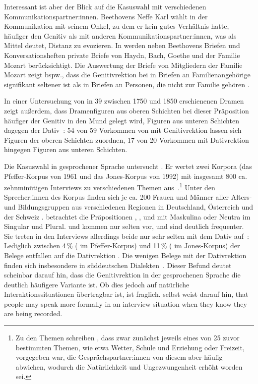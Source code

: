 Interessant ist aber der Blick auf die Kasuswahl mit verschiedenen Kommunikationspartner:innen. 
Beethovens Neffe Karl wählt in der Kommunikation mit seinem Onkel, zu dem er kein gutes Verhältnis hatte, häufiger den Genitiv als mit anderen Kommunikationspartner:innen, was \citet[s.][29]{Sato.2015} als Mittel deutet, Distanz zu evozieren. 
In \citet{Sato.2022} werden neben Beethovens Briefen und Konversationsheften private Briefe von Haydn, Bach, Goethe und der Familie Mozart berücksichtigt.
Die Auswertung der Briefe von Mitgliedern der Familie Mozart zeigt bspw., dass die Genitivrektion bei \wegen{} in Briefen an Familienangehörige signifikant seltener ist als in Briefen an Personen, die nicht zur Familie gehören \citep[s.][96--97]{Sato.2022}. 

In einer Untersuchung von \wegen{} in 39 zwischen 1750 und 1850 erschienenen Dramen zeigt \citet[]{Sato.2016} außerdem, dass Dramenfiguren aus oberen Schichten bei dieser Präposition h{\"a}ufiger der Genitiv in den Mund gelegt wird, Figuren aus unteren Schichten dagegen der Dativ~\citep[s.][409]{Sato.2016}: 
54 von 59 Vorkommen von \wegen{} mit Genitivrektion lassen sich Figuren der oberen Schichten zuordnen, 17 von 20 Vorkommen mit Dativrektion hingegen Figuren aus unteren Schichten.

Die Kasuswahl in gesprochener Sprache untersucht \citet[]{Petig1997}. 
Er wertet zwei Korpora (das Pfeffer-Korpus von 1961 und das Jones-Korpus von 1992) mit insgesamt 800 ca. zehnminütigen Interviews zu verschiedenen Themen aus~\citep[s.][36]{Petig1997}.\footnote{Zu den Themen schreiben \citet[17]{Pfeffer.1984}, dass zwar zunächst jeweils eines von 25 zuvor bestimmten Themen, wie etwa Wetter, Schule und Erziehung oder Freizeit, vorgegeben war, die Gesprächspartner:innen von diesem aber häufig abwichen, wodurch \glqq die Natürlichkeit und Ungezwungenheit erhöht\grqq{} worden sei.} 
Unter den Sprecher:innen des Korpus finden sich je ca. 200 Frauen und Männer aller Alters- und Bildungsgruppen aus verschiedenen Regionen in Deutschland, {\"O}sterreich und der Schweiz \citep[s.][17]{Pfeffer.1984}. 
\citeauthor{Petig1997} betrachtet die Präpositionen , ,  und  mit Maskulina oder Neutra im Singular und Plural. 
 und  kommen nur selten vor, \wegen{} und \waehrend{} sind deutlich frequenter. 
Sie treten in den Interviews allerdings beide nur sehr selten mit dem Dativ auf~\citep[s.][37]{Petig1997}: 
Lediglich zwischen 4\,\% (\waehrend{} im Pfeffer-Korpus) und 11\,\% (\wegen{} im Jones-Korpus) der Belege entfallen auf die Dativrektion \citep[s.][37]{Petig1997}. 
Die wenigen Belege mit der Dativrektion finden sich insbesondere in s{\"u}ddeutschen Dialekten~\citep[s.][38]{Petig1997}. 
Dieser Befund deutet scheinbar darauf hin, dass die Genitivrektion in der gesprochenen Sprache die deutlich häufigere Variante ist. 
Ob dies jedoch auf natürliche Interaktionssituationen übertragbar ist, ist fraglich. 
\citet[37]{Petig1997} selbst weist darauf hin, \glqq that people may speak more formally in an interview situation when they know they are being recorded.\grqq{}

